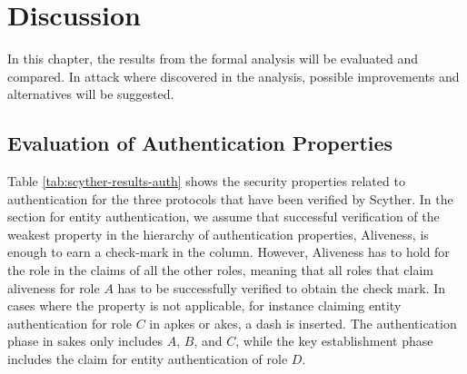 \chapter{Discussion}
\label{chp:discussion}

In this chapter, the results from the formal analysis will be evaluated and compared. In attack where discovered in the analysis, possible improvements and alternatives will be suggested.


\section{Evaluation of Authentication Properties}


Table \ref{tab:scyther-results-auth} shows the security properties related to authentication for the three protocols that have been verified by Scyther. In the section for entity authentication, we assume that successful verification of the weakest property in the hierarchy of authentication properties, Aliveness, is enough to earn a check-mark in the column. However, Aliveness has to hold for the role in the claims of all the other roles, meaning that all roles that claim aliveness for role $A$ has to be successfully verified to obtain the check mark. In cases where the property is not applicable, for instance claiming entity authentication for role $C$ in \gls{apkes} or \gls{akes}, a dash is inserted. The authentication phase in \gls{sakes} only includes $A$, $B$, and $C$, while the key establishment phase includes the claim for entity authentication of role $D$.

\begin{table}[h]
\centering
{}
\caption{Table of the security properties for authentication that are satisfied in the different protocols.}
\label{tab:scyther-results-auth}
\end{table}

